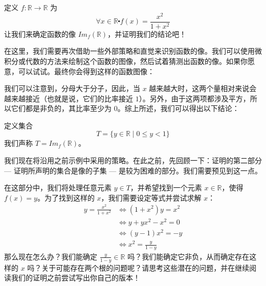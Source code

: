 \begin{example}
    定义 $f : \mathbb{R} \to \mathbb{R}$ 为
    \[\forall x \in \mathbb{R} \centerdot f(x) = \frac{x^2}{1+x^2}\]
    让我们来确定函数的像 $Im_f (\mathbb{R})$，并证明我们的结论吧！

    在这里，我们需要再次借助一些外部策略和直觉来识别函数的像。我们可以使用微积分或代数的方法来绘制这个函数的图像，然后试着猜测出函数的像。如果你愿意，可以试试。最终你会得到这样的函数图像：

    \begin{center}
    \end{center}

    我们可以注意到，分母大于分子，因此，当 $x$ 越来越大时，这两个量相对来说会越来越接近（也就是说，它们的比率接近 $1$）。另外，由于这两项都涉及平方，所以它们都是非负的，其比率至少为 $0$。综上所述，我们可以得出以下结论：

    定义集合
    \[T = \{y \in \mathbb{R} \mid 0 \le y < 1\}\]
    我们声称 $T = Im_f (\mathbb{R})$。

    我们现在将沿用之前示例中采用的策略。在此之前，先回顾一下：证明的第二部分 --- 证明所声明的集合是像的子集 --- 是较为困难的部分。我们需要预见到这一点。

    在这部分中，我们将处理任意元素 $y \in T$，并希望找到一个元素 $x \in \mathbb{R}$，使得 $f(x) = y$。为了找到这样的 $x$，我们需要设定等式并尝试求解 $x$：
    \begin{align*}
        y = \frac{x^2}{1+x^2} &\iff  (1 + x^2)y = x^2 \\
        &\iff y + yx^2 - x^2 = 0 \\
        &\iff (y - 1)x^2 = -y \\
        &\iff x^2=\frac{y}{1-y} 
    \end{align*}
    那么现在怎么办？我们能确定 $\frac{y}{1-y} \in \mathbb{R}$ 吗？我们能确定它非负，从而确定存在这样的 $x$ 吗？关于可能存在两个根的问题呢？请思考这些潜在的问题，并在继续阅读我们的证明之前尝试写出你自己的版本！


\end{example}
